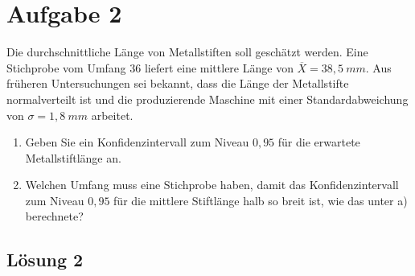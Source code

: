 \documentclass[main.tex]{subfiles}
\begin{document}
\section{Aufgabe 2}
Die durchschnittliche Länge von Metallstiften soll geschätzt werden. Eine Stichprobe vom Umfang $36$ liefert eine mittlere Länge von $\overline{X} = 38,5 \ mm$. Aus früheren Untersuchungen sei bekannt, dass die Länge der Metallstifte normalverteilt ist und die produzierende Maschine mit einer Standardabweichung von $\sigma = 1,8 \ mm$ arbeitet.
\begin{enumerate}
\item Geben Sie ein Konfidenzintervall zum Niveau $0,95$ für die erwartete Metallstiftlänge an.
\item Welchen Umfang muss eine Stichprobe haben, damit das Konfidenzintervall zum Niveau $0,95$ für die mittlere Stiftlänge halb so breit ist, wie das unter a) berechnete?
\end{enumerate}

\subsection{Lösung 2}
\end{document}
